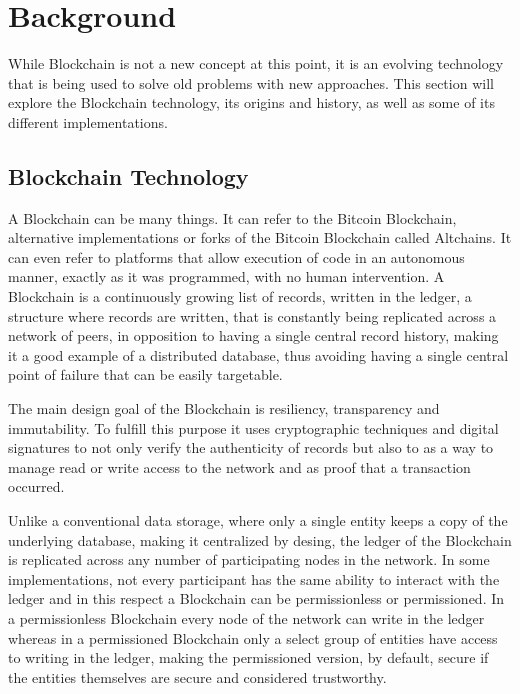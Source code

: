 \chapter{Background}

While Blockchain is not a new concept at this point, it is an evolving
technology that is being used to solve old problems with new approaches. This
section will explore the Blockchain technology, its origins and history, as
well as some of its different implementations. 

\section{Blockchain Technology}

  A Blockchain can be many things. It can refer to the Bitcoin Blockchain,
  alternative implementations or forks of the Bitcoin Blockchain called
  Altchains.  It can even refer to platforms that allow execution of code in an
  autonomous manner, exactly as it was programmed, with no human intervention.
  A Blockchain is a continuously growing list of records, written in the
  ledger, a structure where records are written, that is constantly being
  replicated across a network of peers, in opposition to having a single
  central record history, making it a good example of a distributed database,
  thus avoiding having a single central point of failure that can be easily
  targetable.  \cite{Wood2017}

  The main design goal of the Blockchain is resiliency, transparency and
  immutability. To fulfill this purpose it uses cryptographic techniques and
  digital signatures to not only verify the authenticity of records but also to
  as a way to manage read or write access to the network and as proof that a
  transaction occurred.

  Unlike a conventional data storage, where only a single entity keeps a copy
  of the underlying database, making it centralized by desing, the ledger of
  the Blockchain is replicated across any number of participating nodes in the
  network. In some implementations, not every participant has the same ability
  to interact with the ledger and in this respect a Blockchain can be
  permissionless or permissioned. In a permissionless Blockchain every node of
  the network can write in the ledger whereas in a permissioned Blockchain only
  a select group of entities have access to writing in the ledger, making the
  permissioned version, by default, secure if the entities themselves are
  secure and considered trustworthy.

